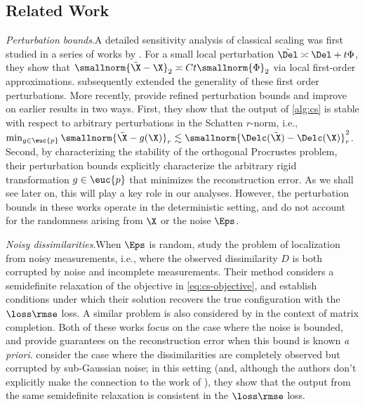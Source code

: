 \documentclass[10pt]{article}
\begin{document}
\subsection{Related Work}
\label{sec:related-work}

\textit{Perturbation bounds}.\quad A detailed sensitivity analysis of classical scaling was first studied in a series of works by \cite{sibson1978studies,sibson1979studies,sibson1981studies}. For a small local perturbation {$\tilde{\Del} \asymp \Del + t\Phi$}, they show that {$\smallnorm{\tilde\X - \X}_2 \asymp C t \smallnorm{\Phi}_2$} via local first-order approximations. \cite{de2004sparse} subsequently extended the generality of these first order perturbations. More recently, \cite{arias2020perturbation} provide refined perturbation bounds and improve on earlier results in two ways. First, they show that the output of \cref{alg:cs} is stable with respect to arbitrary perturbations in the Schatten $r$-norm, i.e., ${\min_{g \in \euc{p}}\smallnorm{\tilde\X - g(\X)}_{r} \lesssim \smallnorm{\Delc(\tilde\X) - \Delc(\X)}_r^2}$. Second, by characterizing the stability of the orthogonal Procrustes problem, their  perturbation bounds explicitly characterize the arbitrary rigid transformation $g \in \euc{p}$ that minimizes the reconstruction error. As we shall see later on, this will play a key role in our analyses. However, the perturbation bounds in these works operate in the deterministic setting, and do not account for the randomness arising from $\X$ or the noise $\Eps$.

\textit{Noisy dissimilarities}.\quad When $\Eps$ is random, \cite{javanmard2013localization} study the problem of localization from noisy measurements, i.e., where the observed dissimilarity $D$ is both corrupted by noise and incomplete measurements. Their method considers a semidefinite relaxation of the objective in \cref{eq:cs-objective}, and establish conditions under which their solution recovers the true configuration with the $\loss\rmse$ loss. A similar problem is also considered by \cite{chatterjee2015matrix} in the context of matrix completion. Both of these works focus on the case where the noise is bounded, and provide guarantees on the reconstruction error when this bound is known \textit{a priori}. \cite{zhang2016distance} consider the case where the dissimilarities are completely observed but corrupted by \iid{} sub-Gaussian noise; in this setting (and, although the authors don't explicitly make the connection to the work of  \citealp{javanmard2013localization}), they show that the output from the same semidefinite relaxation is consistent in the $\loss\rmse$ loss.
\end{document}
